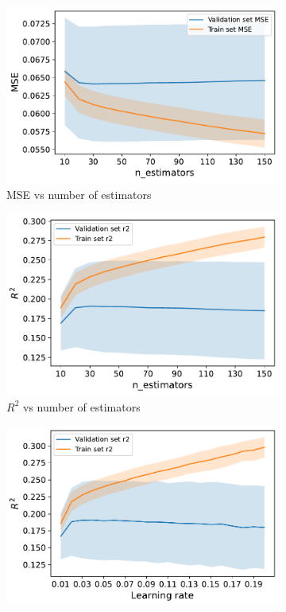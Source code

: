 \documentclass[10pt, a4paper, twocolumn]{article}
\begin{document}
\begin{figure}[b]
\centering
    \begin{subfigure}[t]{0.32\columnwidth}
        \includegraphics[width=\linewidth]{immagini simone/gbreg_estimators_mse.pdf}
        \caption{MSE vs number of estimators}
        \label{fig:mse_gb}
    \end{subfigure}
    \hfill%
    \begin{subfigure}[t]{0.32\columnwidth}
        \includegraphics[width=\linewidth]{immagini simone/gbreg_estimators_r2.pdf}
        \caption{$R^2$ vs number of estimators}
        \label{fig:R2_gb}
    \end{subfigure}
    \hfill%
    \begin{subfigure}[t]{0.32\columnwidth}
        \includegraphics[width=\linewidth]{immagini simone/gbreg_lr_r2.pdf}

\end{subfigure}
\end{figure}
\end{document}
